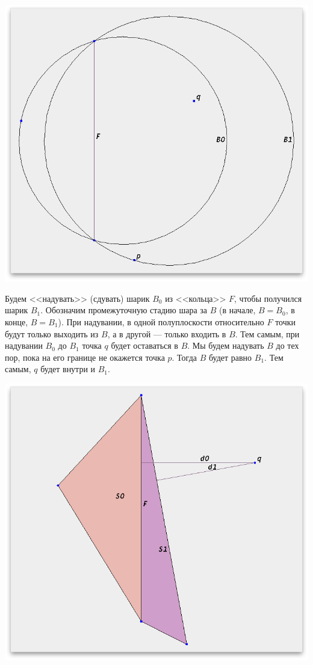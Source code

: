 \documentclass{article}
\begin{document}
        \begin{center}
            \includegraphics[scale=0.45]{2.png}       
        \end{center}
        
        Будем <<надувать>> (сдувать) шарик $B_0$ из <<кольца>> $F$, чтобы получился шарик $B_1$. Обозначим промежуточную стадию шара за $B$ (в начале, $B = B_0$, в конце, $B = B_1$). При надувании, в одной полуплоскости относительно $F$ точки будут только выходить из $B$, а в другой --- только входить в $B$. Тем самым, при надувании $B_0$ до $B_1$ точка $q$ будет оставаться в $B$. Мы будем надувать $B$ до тех пор, пока на его границе не окажется точка $p$. Тогда $B$ будет равно $B_1$. Тем самым, $q$ будет внутри и $B_1$.
        
        \begin{center}
            \includegraphics[scale=0.45]{3.png}       
        \end{center}        
        
\end{document}

